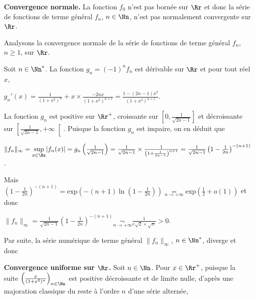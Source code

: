 {\begin{enumerate}
{\begin{center}
\end{center}

\textbf{Convergence normale.} La fonction $f_0$ n'est pas bornée sur $\Rr$ et donc la série de fonctions de terme général $f_n$, $n\in\Nn$, n'est pas normalement convergente sur $\Rr$.

Analysons la convergence normale de la série de fonctions de terme général $f_n$, $n\geqslant1$, sur $\Rr$.

Soit $n\in\Nn^*$. La fonction $g_n=(-1)^nf_n$ est dérivable sur $\Rr$ et pour tout réel $x$,

\begin{center}
$g_n'(x)=\frac{1}{(1+x^2)^n}+x\times\frac{-2nx}{(1+x^2)^{n+1}}=\frac{1-(2n-1)x^2}{(1+x^2)^{n+1}}$.
\end{center}

La fonction $g_n$ est positive sur $\Rr^+$, croissante sur $\left[0,\frac{1}{\sqrt{2n-1}}\right]$ et décroissante sur $\left[\frac{1}{\sqrt{2n-1}},+\infty\right[$. Puisque la fonction $g_n$ est impaire, on en déduit que

\begin{center}
$\|f_n\|_\infty=\underset{x\in\Rr}{\text{sup}}|f_n(x)|=g_n\left(\frac{1}{\sqrt{2n-1}}\right)=\frac{1}{\sqrt{2n-1}}\times\frac{1}{\left(1+\frac{1}{2n-1}\right)^{n+1}}=\frac{1}{\sqrt{2n-1}}\left(1-\frac{1}{2n}\right)^{-(n+1)}$.
\end{center}

Mais $\left(1-\frac{1}{2n}\right)^{-(n+1)}=\text{exp}\left(-(n+1)\ln\left(1-\frac{1}{2n}\right)\right)\underset{n\rightarrow+\infty}{=}\text{exp}\left(\frac{1}{2}+o(1)\right)$ et donc 

\begin{center}
$\|f_n\|_\infty=\frac{1}{\sqrt{2n-1}}\left(1-\frac{1}{2n}\right)^{-(n+1)}\underset{n\rightarrow+\infty}{\sim}\frac{1}{e\sqrt{2}\times\sqrt{n}}>0$.
\end{center}

Par suite, la série numérique de terme général $\|f_n\|_\infty$, $n\in\Nn^*$, diverge et donc

\begin{center}
\end{center}

\textbf{Convergence uniforme sur $\Rr$.} Soit $n\in\Nn$. Pour $x\in\Rr^+$, puisque la suite $\left(\frac{x}{(1+x^2)^n}\right)_{n\in\Nn}$ est positive décroissante et de limite nulle, d'après une majoration classique du reste à l'ordre $n$ d'une série alternée,

}
\end{enumerate}}

